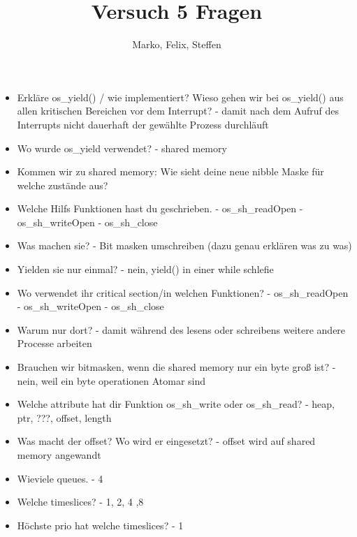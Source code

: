 \documentclass[12pt,a4paper]{article}
\title{Versuch 5 Fragen}
\author{Marko, Felix, Steffen}
\begin{document}
\maketitle

\begin{itemize}
\item Erkläre os_yield() / wie implementiert?
Wieso gehen wir bei os_yield() aus allen kritischen Bereichen vor dem Interrupt?
- damit nach dem Aufruf des Interrupts nicht dauerhaft der gewählte Prozess durchläuft

\item Wo wurde os_yield verwendet? 
- shared memory

\item Kommen wir zu shared memory:
Wie sieht deine neue nibble Maske für welche zustände aus? 

\item Welche Hilfs Funktionen hast du geschrieben.
- os_sh_readOpen
- os_sh_writeOpen
- os_sh_close

\item Was machen sie?
- Bit masken umschreiben (dazu genau erklären was zu was)

\item Yielden sie nur einmal? 
- nein, yield() in einer while schlefie

\item Wo verwendet ihr critical section/in welchen Funktionen?
- os_sh_readOpen
- os_sh_writeOpen
- os_sh_close

\item Warum nur dort?
- damit während des lesens oder schreibens weitere andere Processe arbeiten

\item Brauchen wir bitmasken, wenn die shared memory nur ein byte groß ist?
- nein, weil ein byte operationen Atomar sind

\item Welche attribute hat dir Funktion os_sh_write oder os_sh_read?
- heap, ptr, ???, offset, length

\item Was macht der offset? Wo wird er eingesetzt?
- offset wird auf shared memory angewandt

\item Wieviele queues.
- 4

\item Welche timeslices?
- 1, 2, 4 ,8

\item Höchste prio hat welche timeslices?
- 1


\end{itemize}
\end{document}
